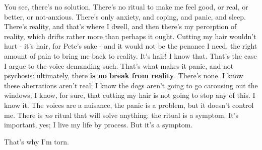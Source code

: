 You see, there's no solution. There's no ritual to make me feel good, or real, or better, or not-anxious. There's only anxiety, and coping, and panic, and sleep. There's reality, and that's where I dwell, and then there's my perception of reality, which drifts rather more than perhaps it ought. Cutting my hair wouldn't hurt - it's hair, for Pete's sake - and it would not be the penance I need, the right amount of pain to bring me back to reality. It's hair! I know that. That's the case I argue to the voice demanding such. That's what makes it panic, and not psychosis: ultimately, there \textbf{is no break from reality}. There's none. I know these aberrations aren't real; I know the dogs aren't going to go carousing out the windows; I know, for sure, that cutting my hair is not going to stop any of this. I know it. The voices are a nuisance, the panic is a problem, but it doesn't control me. There is \emph{no} ritual that will solve anything: the ritual is a symptom. It's important, yes; I live my life by process. But it's a symptom.

That's why I'm torn.
